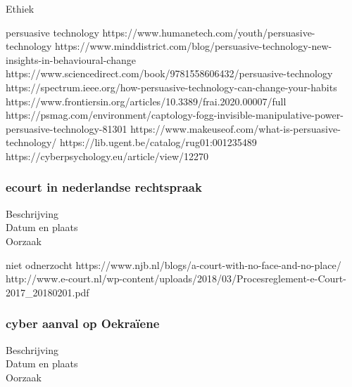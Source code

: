 Ethiek 



persuasive technology 
https://www.humanetech.com/youth/persuasive-technology 
\cite{humanTechpersuasiveTech}
https://www.minddistrict.com/blog/persuasive-technology-new-insights-in-behavioural-change 
https://www.sciencedirect.com/book/9781558606432/persuasive-technology 
https://spectrum.ieee.org/how-persuasive-technology-can-change-your-habits 
\cite{rezenfeld01012018persuasiveTecgHabits}
https://www.frontiersin.org/articles/10.3389/frai.2020.00007/full 
\cite{aldenaini28042020persuasiveTechTrends}
https://psmag.com/environment/captology-fogg-invisible-manipulative-power-persuasive-technology-81301 
\cite{larson14062017persuasivetechmanipulates}
https://www.makeuseof.com/what-is-persuasive-technology/ 
\cite{tanzem22012022persuasivetechchanginglives}
https://lib.ugent.be/catalog/rug01:001235489 
https://cyberpsychology.eu/article/view/12270 
\cite{tikkakuddonenpersuasiveTechnology}



\subsubsection{ecourt in nederlandse rechtspraak}

\begin{description}
\item[Beschrijving]
\item[Datum en plaats] 
\item[Oorzaak]
\end{description}
niet odnerzocht
https://www.njb.nl/blogs/a-court-with-no-face-and-no-place/ 
\cite{sprongken19032018CourtProcedureDigital}
http://www.e-court.nl/wp-content/uploads/2018/03/Procesreglement-e-Court-2017_20180201.pdf
\cite{PROCESREGLEMENTEcourt}


\subsubsection{ cyber aanval op Oekraïene }

\begin{description}
\item[Beschrijving]
\item[Datum en plaats] 
\item[Oorzaak]
\end{description}

